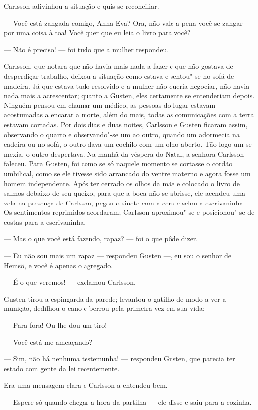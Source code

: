 Carlsson adivinhou a situação e quis se reconciliar.

--- Você está zangada comigo, Anna Eva? Ora, não vale a pena você se zangar por
uma coisa à toa! Você quer que eu leia o livro para você?

--- Não é preciso! --- foi tudo que a mulher respondeu.

Carlsson, que notara que não havia mais nada a fazer e que não gostava de
desperdiçar trabalho, deixou a situação como estava e sentou"-se no sofá de madeira.
Já que estava tudo resolvido e a mulher não queria negociar, não havia nada mais
a acrescentar; quanto a Gusten, eles certamente se entenderiam depois. Ninguém
pensou em chamar um médico, as pessoas do lugar estavam acostumadas a encarar a
morte, além do mais, todas as comunicações com a terra estavam cortadas. Por dois
dias e duas noites, Carlsson e Gusten ficaram assim, observando o quarto e
observando"-se um ao outro, quando um adormecia na cadeira ou no sofá, o outro
dava um cochilo com um olho aberto. Tão logo um se mexia, o outro despertava. Na
manhã da véspera do Natal, a senhora Carlsson faleceu. Para Gusten, foi como
se só naquele momento se cortasse o cordão umbilical, como se ele tivesse sido
arrancado do ventre materno e agora fosse um homem independente. Após ter
cerrado os olhos da mãe e colocado o livro de salmos debaixo de seu queixo, para
que a boca não se abrisse, ele acendeu uma vela na presença de Carlsson, pegou o
sinete com a cera e selou a escrivaninha. Os sentimentos reprimidos acordaram;
Carlsson aproximou"-se e posicionou"-se de costas para a escrivaninha.

--- Mas o que você está fazendo, rapaz? --- foi o que pôde dizer.

--- Eu não sou mais um rapaz --- respondeu Gusten ---, eu sou o senhor de Hemsö, e
você é apenas o agregado.

--- É o que veremos! --- exclamou Carlsson.

Gusten tirou a espingarda da parede; levantou o gatilho de modo a ver a
munição, dedilhou o cano e berrou pela primeira vez em sua vida:

--- Para fora! Ou lhe dou um tiro!

--- Você está me ameaçando?

--- Sim, não há nenhuma testemunha! --- respondeu Gusten, que parecia ter estado
com gente da lei recentemente.

Era uma mensagem clara e Carlsson a entendeu bem.

--- Espere só quando chegar a hora da partilha --- ele disse e saiu para a cozinha.

